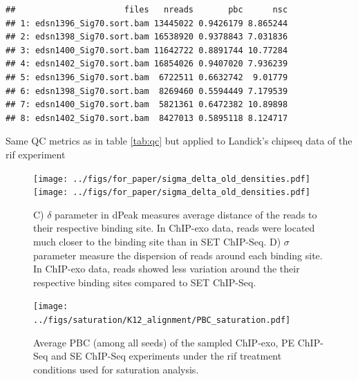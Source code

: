 \documentclass{bmcart}\usepackage[]{graphicx}\usepackage[]{color}
\makeatletter
\newenvironment{kframe}{%
 \def\at@end@of@kframe{}%
 \ifinner\ifhmode%
  \def\at@end@of@kframe{\end{minipage}}%
  \begin{minipage}{\columnwidth}%
 \fi\fi%
 \def\FrameCommand##1{\hskip\@totalleftmargin \hskip-\fboxsep
 \colorbox{shadecolor}{##1}\hskip-\fboxsep
     \hskip-\linewidth \hskip-\@totalleftmargin \hskip\columnwidth}%
 \MakeFramed {\advance\hsize-\width
   \@totalleftmargin\z@ \linewidth\hsize
   \@setminipage}}%
 {\par\unskip\endMakeFramed%
 \at@end@of@kframe}
\newenvironment{knitrout}{}{} %
\makeatother
\begin{document}
\begin{table}[h!]
  \centering
\begin{knitrout}
\color{fgcolor}\begin{kframe}
\begin{verbatim}
##                      files   nreads       pbc      nsc
## 1: edsn1396_Sig70.sort.bam 13445022 0.9426179 8.865244
## 2: edsn1398_Sig70.sort.bam 16538920 0.9378843 7.031836
## 3: edsn1400_Sig70.sort.bam 11642722 0.8891744 10.77284
## 4: edsn1402_Sig70.sort.bam 16854026 0.9407020 7.936239
## 5: edsn1396_Sig70.sort.bam  6722511 0.6632742  9.01779
## 6: edsn1398_Sig70.sort.bam  8269460 0.5594449 7.179539
## 7: edsn1400_Sig70.sort.bam  5821361 0.6472382 10.89898
## 8: edsn1402_Sig70.sort.bam  8427013 0.5895118 8.124717
\end{verbatim}
\end{kframe}
\end{knitrout}
\caption{Same QC metrics as in table \ref{tab:qc} but applied to
  Landick's chipseq data of the rif experiment}
\end{table}

\begin{figure}[h!]
  \centering %
   \texttt{[image: ../figs/for\_paper/sigma\_delta\_old\_densities.pdf]}
   \texttt{[image: ../figs/for\_paper/sigma\_delta\_old\_densities.pdf]}   
  \caption{ C) $\delta$ parameter in dPeak measures average distance
    of the reads to their respective binding site. In ChIP-exo data,
    reads were located much closer to the binding site than in SET
    ChIP-Seq. D) $\sigma$ parameter measure the dispersion of reads
    around each binding site. In ChIP-exo data, reads showed less
    variation around the their respective binding sites compared to
    SET ChIP-Seq.}

\end{figure}

\newpage

\begin{figure}[h!]
  \centering
  \texttt{[image: ../figs/saturation/K12\_alignment/PBC\_saturation.pdf]}
  \caption{Average PBC (among all seeds) of the sampled ChIP-exo, PE
    ChIP-Seq and SE ChIP-Seq experiments under the rif treatment
    conditions used for saturation analysis.}
  \label{fig:pbc_saturation}
\end{figure}

\newpage
\end{document}

